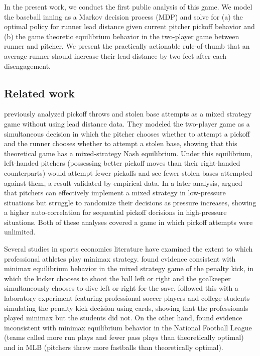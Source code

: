 \documentclass{article}
\begin{document}
    In the present work, we conduct the first public analysis of this game. We model the baseball inning as a Markov decision process (MDP) and solve for (a) the optimal policy for runner lead distance given current pitcher pickoff behavior and (b) the game theoretic equilibrium behavior in the two-player game between runner and pitcher. We present the practically actionable rule-of-thumb that an average runner should increase their lead distance by two feet after each disengagement.

    \subsection{Related work}

    \cite{downey_pick_2015} previously analyzed pickoff throws and stolen base attempts as a mixed strategy game without using lead distance data. They modeled the two-player game as a simultaneous decision in which the pitcher chooses whether to attempt a pickoff and the runner chooses whether to attempt a stolen base, showing that this theoretical game has a mixed-strategy Nash equilibrium. Under this equilibrium, left-handed pitchers (possessing better pickoff moves than their right-handed counterparts) would attempt fewer pickoffs and see fewer stolen bases attempted against them, a result validated by empirical data. In a later analysis, \cite{downey_pressure_2019} argued that pitchers can effectively implement a mixed strategy in low-pressure situations but struggle to randomize their decisions as pressure increases, showing a higher auto-correlation for sequential pickoff decisions in high-pressure situations. Both of these analyses covered a game in which pickoff attempts were unlimited.

    Several studies in sports economics literature have examined the extent to which professional athletes play minimax strategy. \cite{palacios-huerta_professionals_2003} found evidence consistent with minimax equilibrium behavior in the mixed strategy game of the penalty kick, in which the kicker chooses to shoot the ball left or right and the goalkeeper simultaneously chooses to dive left or right for the save. \cite{palacios-huerta_experientia_2008} followed this with a laboratory experiment featuring professional soccer players and college students simulating the penalty kick decision using cards, showing that the professionals played minimax but the students did not. On the other hand, \cite{kovash_professionals_2009} found evidence inconsistent with minimax equilibrium behavior in the National Football League (teams called more run plays and fewer pass plays than theoretically optimal) and in MLB (pitchers threw more fastballs than theoretically optimal).
\end{document}
